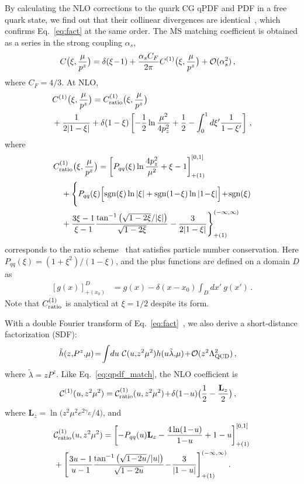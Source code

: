 \documentclass[prd,twocolumn,preprintnumbers,showpacs,nofootinbib,superscriptaddress,notitlepage,floatfix]{revtex4-1}
\DeclareRobustCommand{\eq}[1]{Eq.~\eqref{eq:#1}}
\DeclareRobustCommand{\eq}[1]{Eq.~(\ref{eq:#1})}
\newcommand{\MS}{{\overline{\mathrm{MS}}}}
\newcommand{\nn}{\nonumber}
\begin{document}
By calculating the NLO corrections to the quark CG qPDF and PDF in a free quark state, we find out that their collinear divergences are identical~\cite{Xiong:2013bka}, which confirms \eq{fact} at the same order. The $\MS$ matching coefficient is obtained as a series in the strong coupling $\alpha_s$,
\begin{align}\label{eq:qpdf_match}
	C\big(\xi, {\mu\over p^z}\big) &= \delta(\xi\!-\!1) + {\alpha_sC_F\over 2\pi}C^{(1)}\big(\xi,{\mu\over p^z}\big) + {\cal O}(\alpha_s^2)\,,
\end{align}
where $C_F=4/3$.
At NLO,
\begin{align}
	&C^{(1)}\big(\xi,{\mu\over p^z}\big) = C^{(1)}_{\rm ratio}\big(\xi,{\mu\over p^z}\big)\\
	& + {1\over 2|1-\xi|} +\delta(1-\xi) \left[-{1\over 2}\ln {\mu^2\over 4p_z^2} +{1\over2} - \int_0^1 d\xi' {1\over 1-\xi'}\right]\,,\nn
\end{align}
where
\begin{align}
    &C^{(1)}_{\rm ratio}\big(\xi,{\mu\over p^z}\big) = \left[P_{qq}(\xi)\ln{4p_z^2\over\mu^2} + \xi - 1\right]_{+(1)}^{[0,1]} \\
    & \quad + \Bigg\{P_{qq}(\xi) \Big[\text{sgn}(\xi)\ln|\xi| + \text{sgn}(1\!-\!\xi)\ln|1\!-\!\xi|\Big] \!+\! \text{sgn}(\xi)\nn\\
    &\quad + {3 \xi-1\over \xi-1} \frac{\tan^{-1}\left(\sqrt{1-2 \xi}/|\xi|\right)}{\sqrt{1-2 \xi}} - {3\over 2|1-\xi|} \Bigg\}_{+(1)}^{(-\infty, \infty)}\nn
\end{align}
corresponds to the ratio scheme~\cite{Orginos:2017kos} that satisfies particle number conservation. Here $P_{qq}(\xi)=(1+\xi^2)/(1-\xi)$, and the plus functions are defined on a domain $D$ as
\begin{align}
	\left[g(x)\right]^D_{+(x_0)} &= g(x) - \delta(x-x_0)\int_D dx'\ g(x')\,.
\end{align}
Note that $C^{(1)}_{\rm ratio}$ is analytical at $\xi=1/2$ despite its form.

With a double Fourier transform of \eq{fact}~\cite{Izubuchi:2018srq}, we also derive a short-distance factorization (SDF):
\begin{align}\label{eq:sdf}
	\tilde h(z,\!P^z,\!\mu) &\!=\! \int\! du\ {\cal C}(u,\!z^2\mu^2) h(u \tilde\lambda,\!\mu) \!+\! {\cal O}(z^2\Lambda_{\rm QCD}^2)\,,
\end{align}
where $\tilde\lambda = zP^z$. 
Like \eq{qpdf_match}, the NLO coefficient is
\begin{align}
	{\cal C}^{(1)}(u,z^2\mu^2) &= {\cal C}^{(1)}_{\rm ratio}(u,z^2\mu^2)  \!+\! \delta(1\!-\!u)\big({1\over2}-{\mathbf{L}_z\over2}\big)\,,
\end{align}
where $\mathbf{L}_z=\ln\big(z^2\mu^2e^{2\gamma_E}/ 4\big)$, and
\begin{align}
    &{\cal C}^{(1)}_{\rm ratio}(u,z^2\mu^2)    = \left[-P_{qq}(u)\mathbf{L}_z - {4\ln(1\!-\!u)\over 1\!-\!u} + 1-u\right]_{+(1)}^{[0,1]} \nn\\
    & + \Bigg[ {3 u-1\over u-1} \frac{\tan^{-1}\left(\sqrt{1\!-\!2 u}/|u|\right)}{\sqrt{1-2 u}} \!-\! {3\over |1-u|} \Bigg]_{+(1)}^{(-\infty, \infty)}\,.
\end{align}
\end{document}
